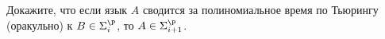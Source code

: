 Докажите, что если язык $A$ сводится за полиномиальное время по Тьюрингу (оракульно) к
$B \in \Sigma_i^\P$, то $A \in \Sigma_{i + 1}^\P$.
